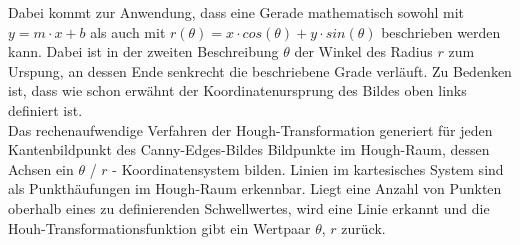 Dabei kommt zur Anwendung, dass eine Gerade mathematisch sowohl mit $y
= m \cdot x + b$ als auch mit $r(\theta) = x \cdot cos(\theta) + y \cdot
sin(\theta)$ beschrieben werden kann. Dabei ist in der zweiten Beschreibung 
$\theta$ der  Winkel des Radius $r$ zum Urspung, an dessen Ende senkrecht die
beschriebene Grade verläuft. Zu Bedenken ist, dass wie schon erwähnt der
Koordinatenursprung des Bildes oben links definiert ist.\\
Das rechenaufwendige Verfahren der Hough-Transformation generiert für jeden
Kantenbildpunkt des Canny-Edges-Bildes Bildpunkte im Hough-Raum, dessen Achsen
ein $\theta$ / $r$ - Koordinatensystem bilden. Linien im kartesisches System
sind als Punkthäufungen im Hough-Raum erkennbar. Liegt eine Anzahl von
Punkten oberhalb eines zu definierenden Schwellwertes, wird eine Linie erkannt
und die Houh-Transformationsfunktion gibt ein Wertpaar $\theta$, $r$ zurück.
